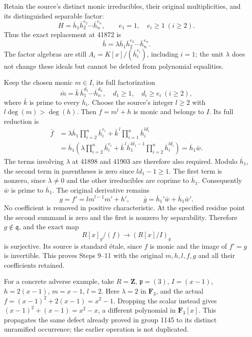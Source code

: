 Retain the source's distinct monic irreducibles, their original multiplicities, and its distinguished separable factor: \[
H=\overline h_1\overline h_2^{e_2}\cdots\overline h_n^{e_n},
\qquad e_1=1,\quad e_i\ge1\ (i\ge2).
\] Thus the exact replacement at 41872 is \[
\bar h=\lambda\overline h_1
                 \overline h_2^{e_2}\cdots\overline h_n^{e_n}.
\] The factor algebras are still \(A_i=K[x]/(\overline h_i^{e_i})\), including \(i=1\); the unit \(\lambda\) does not change these ideals but cannot be deleted from polynomial equalities.

Keep the chosen monic \(m\in I\), its full factorization \[
\bar m=\bar k\,\overline h_1^{d_1}\cdots\overline h_n^{d_n},
\quad d_1\ge1,\quad d_i\ge e_i\ (i\ge2),
\] where \(\bar k\) is prime to every \(\overline h_i\). Choose the source's integer \(l\ge2\) with \(l\deg(m)>\deg(h)\). Then \(f=m^l+h\) is monic and belongs to \(I\). Its full reduction is \[
\begin{aligned}
\bar f
&=\lambda\overline h_1\prod_{i=2}^n\overline h_i^{e_i}
  +\bar k^{\,l}\prod_{i=1}^n\overline h_i^{ld_i}\\
&=\overline h_1\left(
 \lambda\prod_{i=2}^n\overline h_i^{e_i}
 +\bar k^{\,l}\overline h_1^{ld_1-1}
                 \prod_{i=2}^n\overline h_i^{ld_i}\right)
=\overline h_1\bar w .
\end{aligned}
\] The terms involving \(\lambda\) at 41898 and 41903 are therefore also required. Modulo \(\overline h_1\), the second term in parentheses is zero since \(ld_1-1\ge1\). The first term is nonzero, since \(\lambda\ne0\) and the other irreducibles are coprime to \(\overline h_1\). Consequently \(\bar w\) is prime to \(\overline h_1\). The original derivative remains \[
g=f'=l m^{l-1}m'+h',\qquad
\bar g=\overline h_1'\bar w+\overline h_1\bar w'.
\] No coefficient is removed in positive characteristic. At the specified residue point the second summand is zero and the first is nonzero by separability. Therefore \(g\notin\mathfrak q\), and the exact map \[
R[x]_g/(f)\longrightarrow (R[x]/I)_g
\] is surjective. Its source is standard étale, since \(f\) is monic and the image of \(f'=g\) is invertible. This proves Steps 9--11 with the original \(m,h,l,f,g\) and all their coefficients retained.

For a concrete adverse example, take \(R=\mathbf Z\), \(\mathfrak p=(3)\), \(I=(x-1)\), \(h=2(x-1)\), \(m=x-1\), \(l=2\). Here \(\lambda=2\) in \(\mathbf F_3\), and the actual \(f=(x-1)^2+2(x-1)=x^2-1\). Dropping the scalar instead gives \((x-1)^2+(x-1)=x^2-x\), a different polynomial in \(\mathbf F_3[x]\). This propagates the same defect already proved in group 1145 to its distinct unramified occurrence; the earlier operation is not duplicated.

